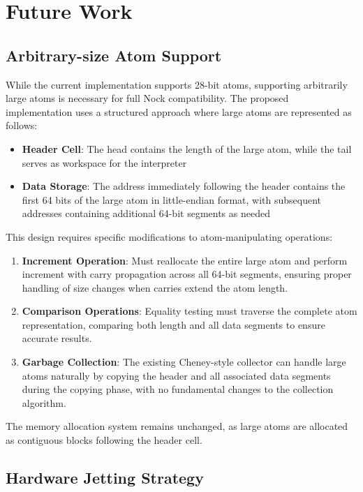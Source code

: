 \documentclass[twoside]{article}
\begin{document}
\section{Future Work}

\subsection{Arbitrary-size Atom Support}

While the current implementation supports 28-bit atoms, supporting arbitrarily large atoms is necessary for full Nock compatibility. The proposed implementation uses a structured approach where large atoms are represented as follows:

\begin{itemize}
  \item \textbf{Header Cell}: The head contains the length of the large atom, while the tail serves as workspace for the interpreter
  \item \textbf{Data Storage}: The address immediately following the header contains the first 64 bits of the large atom in little-endian format, with subsequent addresses containing additional 64-bit segments as needed
\end{itemize}

\noindent
This design requires specific modifications to atom-manipulating operations:

\begin{enumerate}
  \item \textbf{Increment Operation}: Must reallocate the entire large atom and perform increment with carry propagation across all 64-bit segments, ensuring proper handling of size changes when carries extend the atom length.
  \item \textbf{Comparison Operations}: Equality testing must traverse the complete atom representation, comparing both length and all data segments to ensure accurate results.
  \item \textbf{Garbage Collection}: The existing Cheney-style collector can handle large atoms naturally by copying the header and all associated data segments during the copying phase, with no fundamental changes to the collection algorithm.
\end{enumerate}

\noindent
The memory allocation system remains unchanged, as large atoms are allocated as contiguous blocks following the header cell.

\subsection{Hardware Jetting Strategy}
\end{document}
